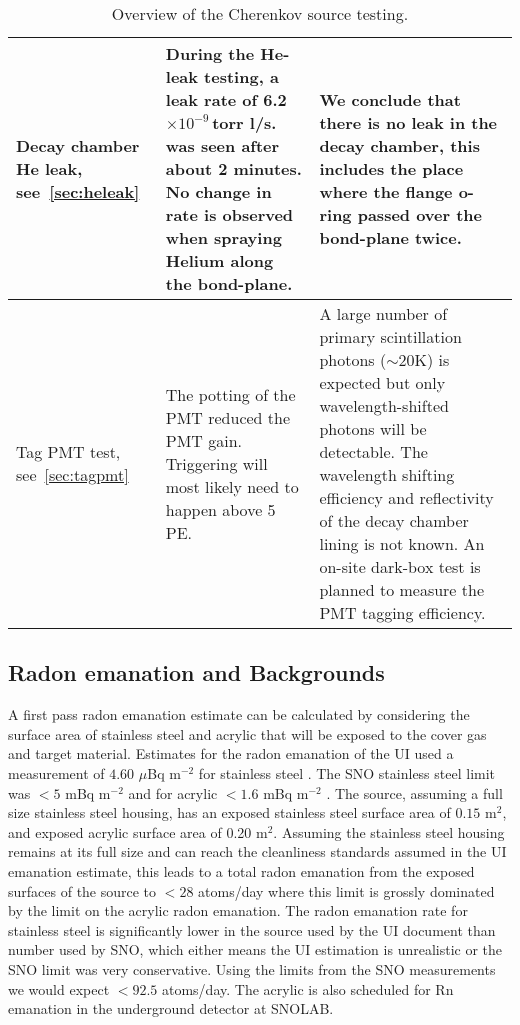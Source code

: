 \begin{table}[p]
\begin{tabular}{|p{2.7cm}|p{6cm}|p{7.3cm}|}
Decay chamber He leak, see~\ref{sec:heleak}
                        & During the He-leak testing, a leak rate of 6.2$\times10^{-9}$\,torr l/s. was seen after about 2 minutes. No change in rate is observed when spraying Helium along the bond-plane. & We conclude that there is no leak in the decay chamber, this includes the place where the flange o-ring passed over the bond-plane twice. \\ \hline

Tag PMT test, see~\ref{sec:tagpmt} 
                        & The potting of the PMT reduced the PMT gain. Triggering will most likely need to happen above 5\,PE. 
                        & A large number of primary scintillation photons ($\sim$20K) is expected but only wavelength-shifted photons will be detectable. The wavelength shifting efficiency and reflectivity of the decay chamber lining is not known. An on-site dark-box test is planned to measure the PMT tagging efficiency. \\ \hline
\end{tabular}
\caption{\label{tab:testoverview} Overview of the Cherenkov source testing.}
\end{table}

\subsection{Radon emanation and Backgrounds}
\label{sec:emanation}
A first pass radon emanation estimate can be calculated by considering the surface area of stainless steel and acrylic that will be exposed to the cover gas and target material. Estimates for the radon emanation of the UI used a measurement of $4.60$ $\mu$Bq m$^{-2}$ for stainless steel \cite{kormos:2015}. The SNO stainless steel limit was $< 5$ mBq m$^{-2}$ and for acrylic $< 1.6$ mBq m$^{-2}$ \cite{Liu:1993}. The source, assuming a full size stainless steel housing, has an exposed stainless steel surface area of $0.15$ m$^2$, and exposed acrylic surface area of 0.20 m$^2$. Assuming the stainless steel housing remains at its full size and can reach the cleanliness standards assumed in the UI emanation estimate, this leads to a total radon emanation from the exposed surfaces of the source to $<28$ atoms/day where this limit is grossly dominated by the limit on the acrylic radon emanation. The radon emanation rate for stainless steel is significantly lower in the source used by the UI document than number used by SNO, which either means the UI estimation is unrealistic or the SNO limit was very conservative. Using the limits from the SNO measurements we would expect $<92.5$ atoms/day. The acrylic is also scheduled for Rn emanation in the underground detector at SNOLAB.


